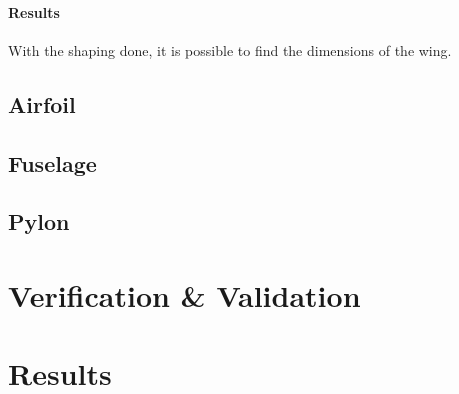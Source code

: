 \paragraph{Results} With the shaping done, it is possible to find the dimensions of the wing.

\subsection*{Airfoil}

\subsection{Fuselage}

\subsection{Pylon}

\section{Verification \& Validation}

\section{Results}





